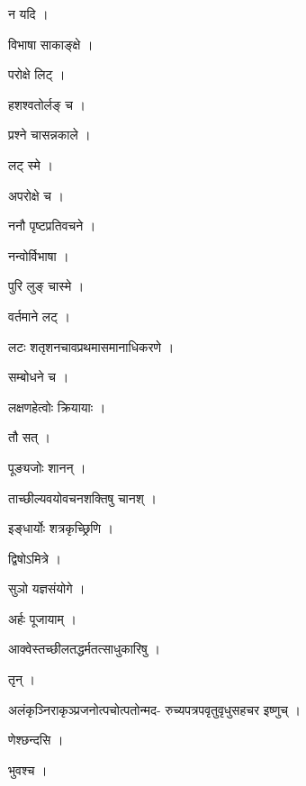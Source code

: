 \documentclass[10pt, openany]{book}
\begin{document}
\noindent न यदि ।

\noindent विभाषा साकाङ्क्षे ।

\noindent परोक्षे लिट् ।

\noindent हशश्वतोर्लङ् च ।

\noindent प्रश्ने चासन्नकाले ।

\noindent लट् स्मे ।

\noindent अपरोक्षे च ।

\noindent ननौ पृष्टप्रतिवचने ।

\noindent नन्वोर्विभाषा ।

\noindent पुरि लुङ् चास्मे ।

\noindent वर्तमाने लट् ।

\noindent लटः शतृशनचावप्रथमासमानाधिकरणे ।

\noindent सम्बोधने च ।

\noindent लक्षणहेत्वोः क्रियायाः ।

\noindent तौ सत् ।

\noindent पूङ्यजोः शानन् ।

\noindent ताच्छील्यवयोवचनशक्तिषु चानश् ।

\noindent इङ्धार्योः शत्रकृच्छ्रिणि ।

\noindent द्विषोऽमित्रे ।

\noindent सुञो यज्ञसंयोगे ।

\noindent अर्हः पूजायाम् ।

\noindent आक्वेस्तच्छीलतद्धर्मतत्साधुकारिषु ।

\noindent तृन् ।

\noindent अलंकृञ्निराकृञ्प्रजनोत्पचोत्पतोन्मद- रुच्यपत्रपवृतुवृधुसहचर इष्णुच् ।

\noindent णेश्छन्दसि ।

\noindent भुवश्च ।
\end{document}
